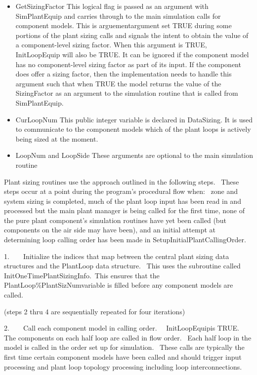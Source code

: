 \begin{itemize}
\item
  GetSizingFactor This logical flag is passed as an argument with SimPlantEquip and carries through to the main simulation calls for component models. This is arguementargument set TRUE during some portions of the plant sizing calls and signals the intent to obtain the value of a component-level sizing factor. When this argument is TRUE, InitLoopEquip will also be TRUE. It can be ignored if the component model has no component-level sizing factor as part of its input. If the component does offer a sizing factor, then the implementation needs to handle this argument such that when TRUE the model returns the value of the SizingFactor as an argument to the simulation routine that is called from SimPlantEquip.
\item
  CurLoopNum This public integer variable is declared in DataSizing. It is used to communicate to the component models which of the plant loops is actively being sized at the moment.
\item
  LoopNum and LoopSide These arguments are optional to the main simulation routine
\end{itemize}

Plant sizing routines use the approach outlined in the following steps.~ These steps occur at a point during the program's procedural flow when:~ zone and system sizing is completed, much of the plant loop input has been read in and processed but the main plant manager is being called for the first time, none of the pure plant component's simulation routines have yet been called (but components on the air side may have been), and an initial attempt at determining loop calling order has been made in SetupInitialPlantCallingOrder.

1.~~~~Initialize the indices that map between the central plant sizing data structures and the PlantLoop data structure.~ This uses the subroutine called InitOneTimePlantSizingInfo.~This ensures that the PlantLoop\%PlantSizNumvariable is filled before any component models are called.

(steps 2 thru 4 are sequentially repeated for four iterations)

2.~~~~Call each component model in calling order.~~ InitLoopEquipis TRUE.~ The components on each half loop are called in flow order.~ Each half loop in the model is called in the order set up for simulation.~ These calls are typically the first time certain component models have been called and should trigger input processing and plant loop topology processing including loop interconnections.

